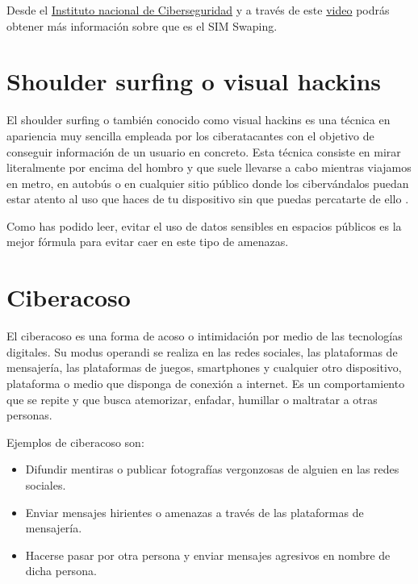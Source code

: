 \documentclass[
  a4paper,
  openany]{book}
\begin{document}
Desde el \href{https://www.incibe.es/}{Instituto nacional de Ciberseguridad} y a través de este \href{https://www.youtube.com/watch?v=fIaodow_nxw}{video} podrás obtener más información sobre que es el SIM Swaping.

\hypertarget{shoulder-surfing-o-visual-hackins}{%
\section{Shoulder surfing o visual hackins}\label{shoulder-surfing-o-visual-hackins}}

El shoulder surfing o también conocido como visual hackins es una técnica en apariencia muy sencilla empleada por los ciberatacantes con el objetivo de conseguir información de un usuario en concreto. Esta técnica consiste en mirar literalmente por encima del hombro y que suele llevarse a cabo mientras viajamos en metro, en autobús o en cualquier sitio público donde los cibervándalos puedan estar atento al uso que haces de tu dispositivo sin que puedas percatarte de ello \citep{OSI-shoulder-surfing}.

Como has podido leer, evitar el uso de datos sensibles en espacios públicos es la mejor fórmula para evitar caer en este tipo de amenazas.

\hypertarget{ciberacoso}{%
\section{Ciberacoso}\label{ciberacoso}}

El ciberacoso es una forma de acoso o intimidación por medio de las tecnologías digitales. Su modus operandi se realiza en las redes sociales, las plataformas de mensajería, las plataformas de juegos, smartphones y cualquier otro dispositivo, plataforma o medio que disponga de conexión a internet. Es un comportamiento que se repite y que busca atemorizar, enfadar, humillar o maltratar a otras personas.

Ejemplos de ciberacoso son:

\begin{itemize}
\item
  Difundir mentiras o publicar fotografías vergonzosas de alguien en las redes sociales.
\item
  Enviar mensajes hirientes o amenazas a través de las plataformas de mensajería.
\item
  Hacerse pasar por otra persona y enviar mensajes agresivos en nombre de dicha persona.
\end{itemize}
\end{document}
